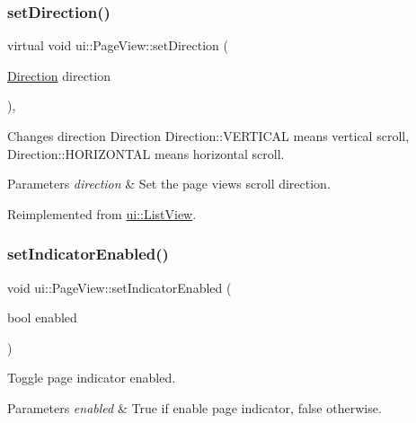\subsubsection{\texorpdfstring{set\+Direction()}{setDirection()}\hspace{0.1cm}{\footnotesize\ttfamily [2/2]}}
{\footnotesize\ttfamily virtual void ui\+::\+Page\+View\+::set\+Direction (\begin{DoxyParamCaption}\item[{\hyperlink{classui_1_1ScrollView_aed2d778ae8098dcafe323b2beae8dd6b}{Direction}}]{direction }\end{DoxyParamCaption})\hspace{0.3cm}{\ttfamily [override]}, {\ttfamily [virtual]}}

Changes direction Direction Direction\+::\+V\+E\+R\+T\+I\+C\+AL means vertical scroll, Direction\+::\+H\+O\+R\+I\+Z\+O\+N\+T\+AL means horizontal scroll. 
\begin{DoxyParams}{Parameters}
{\em direction} & Set the page view\textquotesingle{}s scroll direction. \\
\hline
\end{DoxyParams}


Reimplemented from \hyperlink{classui_1_1ListView_aaac3381602537a823529058b64bffabf}{ui\+::\+List\+View}.

\mbox{\label{classui_1_1PageView_a2fc6399772e0381cd8cfcd3e39aff5f2}} 
\subsubsection{\texorpdfstring{set\+Indicator\+Enabled()}{setIndicatorEnabled()}\hspace{0.1cm}{\footnotesize\ttfamily [1/2]}}
{\footnotesize\ttfamily void ui\+::\+Page\+View\+::set\+Indicator\+Enabled (\begin{DoxyParamCaption}\item[{bool}]{enabled }\end{DoxyParamCaption})}



Toggle page indicator enabled. 


\begin{DoxyParams}{Parameters}
{\em enabled} & True if enable page indicator, false otherwise. \\
\hline
\end{DoxyParams}
\mbox{\label{classui_1_1PageView_a2fc6399772e0381cd8cfcd3e39aff5f2}} 
